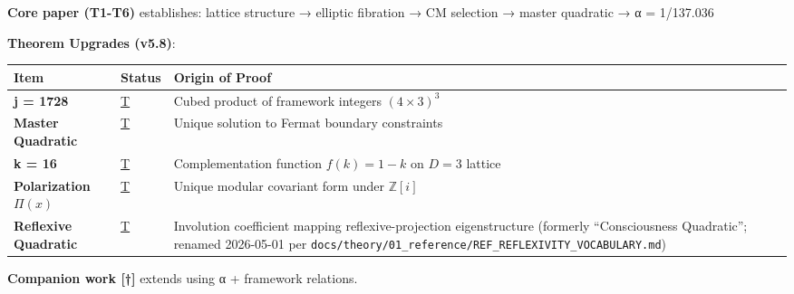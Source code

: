 \documentclass[
  11pt,
  letterpaper,
  twoside,
  openright]{book}
\begin{document}
\begin{tcolorbox}[enhanced jigsaw, coltitle=black, colbacktitle=quarto-callout-warning-color!10!white, toprule=.15mm, colframe=quarto-callout-warning-color-frame, arc=.35mm, opacityback=0, bottomtitle=1mm, toptitle=1mm, breakable, colback=white, titlerule=0mm, opacitybacktitle=0.6, title=\textcolor{quarto-callout-warning-color}{\faExclamationTriangle}\hspace{0.5em}{Core Paper vs.~Companion Work}, rightrule=.15mm, bottomrule=.15mm, leftrule=.75mm, left=2mm]

\textbf{Core paper (T1-T6)} establishes: lattice structure → elliptic
fibration → CM selection → master quadratic → α = 1/137.036

\textbf{Theorem Upgrades (v5.8)}:

\begin{longtable}[]{@{}
  >{\raggedright\arraybackslash}p{}
  >{\raggedright\arraybackslash}p{}
  >{\raggedright\arraybackslash}p{}@{}}
\toprule\noalign{}
\begin{minipage}[b]{\linewidth}\raggedright
Item
\end{minipage} & \begin{minipage}[b]{\linewidth}\raggedright
Status
\end{minipage} & \begin{minipage}[b]{\linewidth}\raggedright
Origin of Proof
\end{minipage} \\
\midrule\noalign{}
\endhead
\bottomrule\noalign{}
\endlastfoot
\textbf{j = 1728} & \hyperref[t]{T} & Cubed product of framework
integers \((4 \times 3)^3\) \\
\textbf{Master Quadratic} & \hyperref[t]{T} & Unique solution to Fermat
boundary constraints \\
\textbf{k = 16} & \hyperref[t]{T} & Complementation function
\(f(k)=1-k\) on \(D=3\) lattice \\
\textbf{Polarization \(\Pi(x)\)} & \hyperref[t]{T} & Unique modular
covariant form under \(\mathbb{Z}[i]\) \\
\textbf{Reflexive Quadratic} & \hyperref[t]{T} & Involution coefficient
mapping reflexive-projection eigenstructure (formerly ``Consciousness
Quadratic''; renamed 2026-05-01 per
\texttt{docs/theory/01\_reference/REF\_REFLEXIVITY\_VOCABULARY.md}) \\
\end{longtable}

\textbf{Companion work {[}†{]}} extends using α + framework relations.

\end{tcolorbox}
\end{document}
